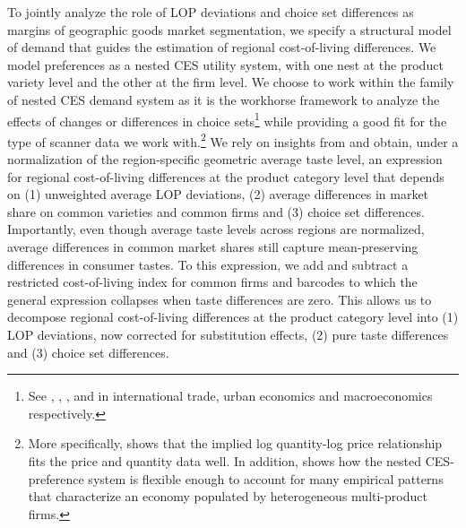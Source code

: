To jointly analyze the role of LOP deviations and choice set differences as margins of geographic goods market segmentation, we specify a structural model of demand that guides the estimation of regional cost-of-living differences. We model preferences as a nested CES utility system, with one nest at the product variety level and the other at the firm level. We choose to work within the family of nested CES demand system as it is the workhorse framework to analyze the effects of changes or differences in choice sets\footnote{See \citet{Feenstra1994}, \citet{Broda2006}, \citet{Handbury2015}, \citet{Romer1990} and \citet{Jaravel2019} in international trade, urban economics and macroeconomics respectively.} while providing a good fit for the type of scanner data we work with.\footnote{More specifically, \citet{Dellavigna2019} shows that the implied log quantity-log price relationship fits the price and quantity data well. In addition, \citet{Hottman2016} shows how the nested CES-preference system is flexible enough to account for many empirical patterns that characterize an economy populated by heterogeneous multi-product firms.} We rely on insights from \citet{Redding2020} and obtain, under a normalization of the region-specific geometric average taste level, an expression for regional cost-of-living differences at the product category level that depends on (1) unweighted average LOP deviations, (2) average differences in market share on common varieties and common firms and (3) choice set differences. Importantly, even though average taste levels across regions are normalized, average differences in common market shares still capture mean-preserving differences in consumer tastes. To this expression, we add and subtract a restricted cost-of-living index for common firms and barcodes to which the general expression collapses when taste differences are zero. This allows us to decompose regional cost-of-living differences at the product category level into (1) LOP deviations, now corrected for substitution effects, (2) pure taste differences and (3) choice set differences. 

